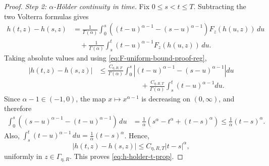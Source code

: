 \documentclass[10pt,a4paper]{amsart}
\begin{document}
\begin{proof}
\medskip
\noindent
\textit{Step 2: $\alpha$-H\"older continuity in time.}
Fix $0\le s<t\le T$. Subtracting the two Volterra formulas gives
\begin{align*}
  h(t,z)-h(s,z)
  &=
  \frac{1}{\Gamma(\alpha)}
  \int_0^s
  \left((t-u)^{\alpha-1}-(s-u)^{\alpha-1}\right)F_z(h(u,z))\,du\\
  &\quad
  +
  \frac{1}{\Gamma(\alpha)}
  \int_s^t (t-u)^{\alpha-1}F_z(h(u,z))\,du.
\end{align*}
Taking absolute values and using \eqref{eq:F-uniform-bound-proof-reg},
\begin{align*}
  |h(t,z)-h(s,z)|
  &\le
  \frac{C_{\eta,R,T}}{\Gamma(\alpha)}
  \int_0^s
  \left|(t-u)^{\alpha-1}-(s-u)^{\alpha-1}\right|du
  \\
  &\qquad\qquad\qquad
  +
  \frac{C_{\eta,R,T}}{\Gamma(\alpha)}
  \int_s^t (t-u)^{\alpha-1}du.
\end{align*}
Since $\alpha-1\in(-1,0)$, the map $x\mapsto x^{\alpha-1}$ is decreasing on
$(0,\infty)$, and therefore
\begin{align*}
  \int_0^s\left((s-u)^{\alpha-1}-(t-u)^{\alpha-1}\right)\,du
  &=
  \frac{1}{\alpha}\left(s^\alpha-t^\alpha+(t-s)^\alpha\right)
  \le \frac{1}{\alpha}(t-s)^\alpha.
\end{align*}
Also,
$\int_s^t (t-u)^{\alpha-1}\,du=\frac1\alpha (t-s)^\alpha$.
Hence,
\[
  |h(t,z)-h(s,z)|
  \le C_{\eta,R,T}|t-s|^\alpha,
\]
uniformly in $z\in\Gamma_{\eta,R}$. This proves \eqref{eq:h-holder-t-prop}.


\end{proof}
\end{document}
